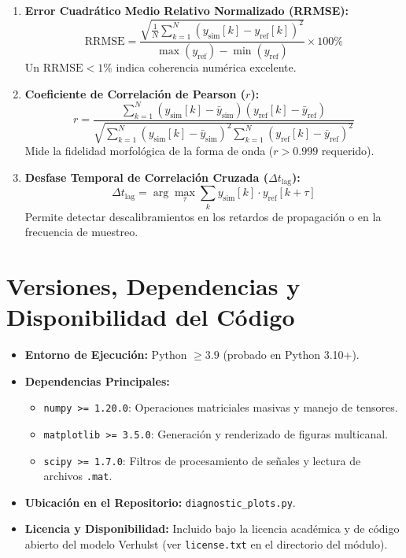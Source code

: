 \documentclass[12pt,a4paper]{article}
\begin{document}
\begin{enumerate}
    \item \textbf{Error Cuadrático Medio Relativo Normalizado (RRMSE):}
    \begin{equation}
    \text{RRMSE} = \frac{\sqrt{\frac{1}{N} \sum_{k=1}^{N} \left( y_{\text{sim}}[k] - y_{\text{ref}}[k] \right)^2}}{\max(y_{\text{ref}}) - \min(y_{\text{ref}})} \times 100\%
    \end{equation}
    Un $\text{RRMSE} < 1\%$ indica coherencia numérica excelente.

    \item \textbf{Coeficiente de Correlación de Pearson ($r$):}
    \begin{equation}
    r = \frac{\sum_{k=1}^N (y_{\text{sim}}[k] - \bar{y}_{\text{sim}})(y_{\text{ref}}[k] - \bar{y}_{\text{ref}})}{\sqrt{\sum_{k=1}^N (y_{\text{sim}}[k] - \bar{y}_{\text{sim}})^2 \sum_{k=1}^N (y_{\text{ref}}[k] - \bar{y}_{\text{ref}})^2}}
    \end{equation}
    Mide la fidelidad morfológica de la forma de onda ($r > 0.999$ requerido).

    \item \textbf{Desfase Temporal de Correlación Cruzada ($\Delta t_{\text{lag}}$):}
    \begin{equation}
    \Delta t_{\text{lag}} = \arg\max_{\tau} \sum_{k} y_{\text{sim}}[k] \cdot y_{\text{ref}}[k + \tau]
    \end{equation}
    Permite detectar descalibramientos en los retardos de propagación o en la frecuencia de muestreo.
\end{enumerate}

\section{Versiones, Dependencias y Disponibilidad del Código}

\begin{itemize}
    \item \textbf{Entorno de Ejecución:} Python $\ge 3.9$ (probado en Python 3.10+).
    \item \textbf{Dependencias Principales:}
    \begin{itemize}
        \item \texttt{numpy >= 1.20.0}: Operaciones matriciales masivas y manejo de tensores.
        \item \texttt{matplotlib >= 3.5.0}: Generación y renderizado de figuras multicanal.
        \item \texttt{scipy >= 1.7.0}: Filtros de procesamiento de señales y lectura de archivos \texttt{.mat}.
    \end{itemize}
    \item \textbf{Ubicación en el Repositorio:} {\texttt{diagnostic_plots.py}}.
    \item \textbf{Licencia y Disponibilidad:} Incluido bajo la licencia académica y de código abierto del modelo Verhulst (ver \texttt{license.txt} en el directorio del módulo).
\end{itemize}
\end{document}
